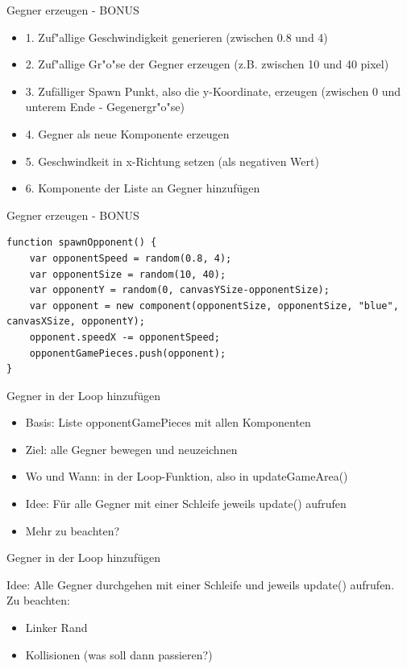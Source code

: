 \documentclass[18pt]{beamer}
\begin{document}
\begin{frame}[fragile]{Gegner erzeugen - BONUS}
\begin{itemize}
	\item 1. Zuf"allige Geschwindigkeit generieren (zwischen 0.8 und 4)
	 \item 2. Zuf"allige Gr"o"se der Gegner erzeugen (z.B. zwischen 10 und 40 pixel)  
	\item 3. Zufälliger Spawn Punkt, also die y-Koordinate, erzeugen (zwischen 0 und unterem Ende - Gegenergr"o"se) 
	\item 4. Gegner als neue Komponente erzeugen
	\item 5. Geschwindkeit in x-Richtung setzen (als negativen Wert)
	\item 6. Komponente der Liste an Gegner hinzufügen	
\end{itemize}
\end{frame}
\begin{frame}[fragile]{Gegner erzeugen - BONUS}
\begin{lstlisting}
function spawnOpponent() {
	var opponentSpeed = random(0.8, 4);
	var opponentSize = random(10, 40);
	var opponentY = random(0, canvasYSize-opponentSize);
	var opponent = new component(opponentSize, opponentSize, "blue", canvasXSize, opponentY);
	opponent.speedX -= opponentSpeed;
	opponentGamePieces.push(opponent);
}
\end{lstlisting}
\end{frame}

\begin{frame}{Gegner in der Loop hinzufügen}
\begin{itemize}
	\item Basis: Liste \glqq opponentGamePieces\grqq{} mit allen Komponenten
	\item Ziel: alle Gegner bewegen und neuzeichnen 
	\item Wo und Wann: in der Loop-Funktion, also in \glqq updateGameArea()\grqq{}
	\item Idee: Für alle Gegner mit einer Schleife jeweils \glqq update()\grqq{} aufrufen
	\item Mehr zu beachten? 
\end{itemize}
\end{frame}

\begin{frame}{Gegner in der Loop hinzufügen}

Idee: Alle Gegner durchgehen mit einer Schleife und jeweils \glqq update()\grqq{} aufrufen.\\
Zu beachten:
\begin{itemize}
	\item Linker Rand
	\item Kollisionen (was soll dann passieren?) 
\end{itemize}
\end{frame}
\end{document}
